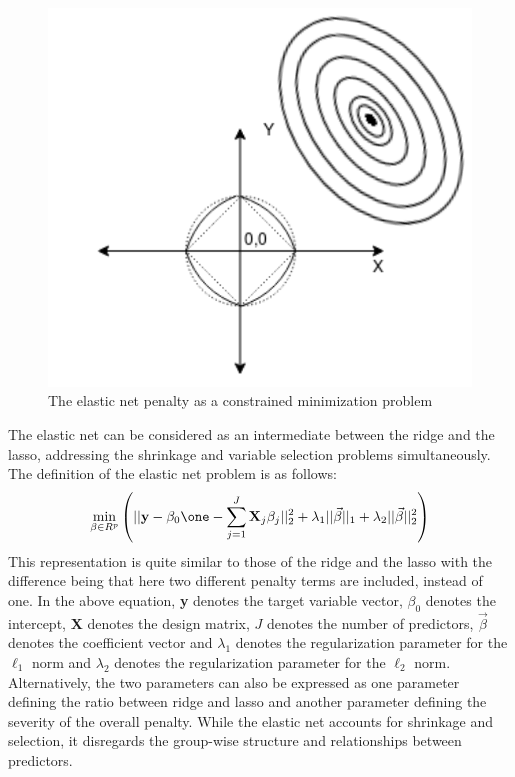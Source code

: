 \documentclass[a4paper,12pt]{article}
\begin{document}
\begin{figure}[H]
    \centering
    \includegraphics[scale=0.4]{elastic-net.png}
    \caption{The elastic net penalty as a constrained minimization problem}
    \label{fig:ALAMO Flowchart}
\end{figure}
The elastic net  can be considered  as an intermediate between the ridge and the lasso, addressing the shrinkage and variable selection problems simultaneously. The definition of the elastic net problem is as follows:
\begin{eqnarray}
\label{eq:6}
\min_{\beta\in R^p}\left(|| \textbf{y}-\beta_0\one-\sum_{j=1}^J
\textbf{X}_j\beta_j||_2^2 + \lambda_1 ||\vec{\beta}||_1 + \lambda_2 ||\vec{\beta}||_2^2 \right)
\end{eqnarray}
This representation is quite similar to those of the ridge and the lasso with the difference being that here two different penalty terms are included, instead of one. In the above equation, \textbf{y} denotes the target variable vector, $\beta_0$ denotes the intercept, \textbf{X} denotes the design matrix, $J$ denotes the number of predictors, $\vec{\beta}$ denotes the coefficient vector and $\lambda_1$ denotes the regularization parameter for the $\ell_1$ norm and $\lambda_2$ denotes the regularization parameter for the $\ell_2$ norm. Alternatively, the two parameters can also be expressed as one parameter defining the ratio between ridge and lasso and another parameter defining the severity of the overall penalty. While the elastic net accounts for shrinkage and selection, it disregards the group-wise structure and relationships between predictors.
\newpage
\end{document}
